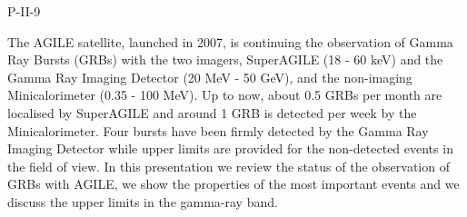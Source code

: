 P-II-9


\bigskip



\bigskip

\noindent The AGILE satellite, launched in 2007, is continuing the observation of Gamma Ray Bursts (GRBs) with the two imagers,
SuperAGILE (18 - 60 keV) and the Gamma Ray Imaging Detector (20 MeV - 50 GeV), and the non-imaging Minicalorimeter (0.35 - 100 MeV). Up to now, about 0.5 GRBs per month are localised by SuperAGILE and around 1 GRB is detected per week by the Minicalorimeter. Four
bursts have been firmly detected by the Gamma Ray Imaging Detector while upper limits are provided for the non-detected events in the field of view. In this presentation we review the status of the observation of GRBs with AGILE, we show the properties of the most important events and we discuss the upper limits in the gamma-ray
band.

